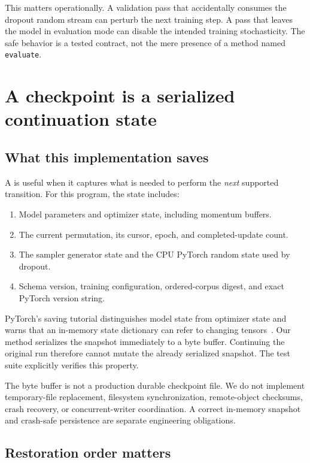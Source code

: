 This matters operationally. A validation pass that accidentally consumes the dropout random stream can perturb the next training step. A pass that leaves the model in evaluation mode can disable the intended training stochasticity. The safe behavior is a tested contract, not the mere presence of a method named \texttt{evaluate}.

\section{A checkpoint is a serialized continuation state}

\subsection{What this implementation saves}

A  is useful when it captures what is needed to perform the \emph{next} supported transition. For this program, the state includes:

\begin{enumerate}
\item Model parameters and optimizer state, including momentum buffers.
\item The current permutation, its cursor, epoch, and completed-update count.
\item The sampler generator state and the CPU PyTorch random state used by dropout.
\item Schema version, training configuration, ordered-corpus digest, and exact PyTorch version string.
\end{enumerate}

PyTorch's saving tutorial distinguishes model state from optimizer state and warns that an in-memory state dictionary can refer to changing tensors~\cite{save}. Our method serializes the snapshot immediately to a byte buffer. Continuing the original run therefore cannot mutate the already serialized snapshot. The test suite explicitly verifies this property.

The byte buffer is not a production durable checkpoint file. We do not implement temporary-file replacement, filesystem synchronization, remote-object checksums, crash recovery, or concurrent-writer coordination. A correct in-memory snapshot and crash-safe persistence are separate engineering obligations.

\subsection{Restoration order matters}

